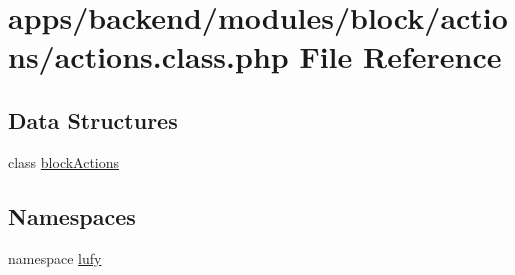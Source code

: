 \hypertarget{backend_2modules_2block_2actions_2actions_8class_8php}{\section{apps/backend/modules/block/actions/actions.class.\-php File Reference}
\label{backend_2modules_2block_2actions_2actions_8class_8php}
}
\subsection*{Data Structures}
\begin{DoxyCompactItemize}
\item 
class \hyperlink{classblock_actions}{block\-Actions}
\end{DoxyCompactItemize}
\subsection*{Namespaces}
\begin{DoxyCompactItemize}
\item 
namespace \hyperlink{namespacelufy}{lufy}
\end{DoxyCompactItemize}
